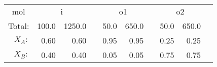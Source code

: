 \documentclass[12pt]{article}
\begin{document}
\begin{center}
\begin{tabular}{r *{3}{r r c}}
	
	\multicolumn{1}{c}{\unit{\mole}}
	& \multicolumn{2}{c}{i}  &
	& \multicolumn{2}{c}{o1} &
	& \multicolumn{2}{c}{o2} &
	
	\\ \cmidrule{2-3} \cmidrule{5-6} \cmidrule{8-9}
	
	\multicolumn{1}{c}{Total:}
	& 100.0 	& 1250.0	&
	& 50.0 	&  650.0	&
	& 50.0 	&  650.0	&
	
	\\ \midrule
	
	$X_A:$
	& 0.60	& 0.60	&
	& 0.95	& 0.95	&
	& 0.25	& 0.25	&
	
	\\
	
	$X_B:$
	& 0.40	& 0.40	&
	& 0.05	& 0.05	&
	& 0.75	& 0.75	&
	
	\\ \midrule
	
\end{tabular}
\end{center}



\section{}
\end{document}
